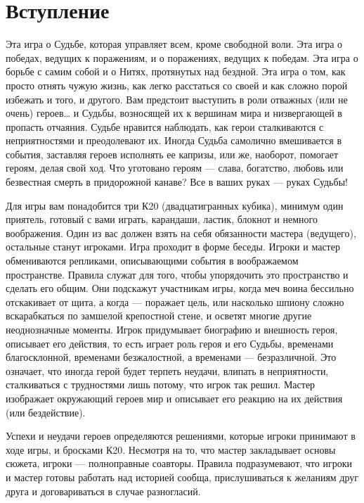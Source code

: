 \chapter*{Вступление}
Эта игра о Судьбе, которая управляет всем, кроме свободной воли. Эта игра о победах, ведущих к поражениям, и о поражениях, ведущих к победам. Эта игра о борьбе с самим собой и о Нитях, протянутых над бездной. Эта игра о том, как просто отнять чужую жизнь, как легко расстаться со своей и как сложно порой избежать и того, и другого.
Вам предстоит выступить в роли отважных (или не очень) героев… и Судьбы, возносящей их к вершинам мира и низвергающей в пропасть отчаяния. Судьбе нравится наблюдать, как герои сталкиваются с неприятностями и преодолевают их. Иногда Судьба самолично вмешивается в события, заставляя героев исполнять ее капризы, или же, наоборот, помогает героям, делая свой ход. Что уготовано героям — слава, богатство, любовь или безвестная смерть в придорожной канаве? Все в ваших руках — руках Судьбы!

Для игры вам понадобится три К20 (двадцатигранных кубика), минимум один приятель, готовый с вами играть, карандаши, ластик, блокнот и немного воображения. Один из вас должен взять на себя обязанности мастера (ведущего), остальные станут игроками. Игра проходит в форме беседы. Игроки и мастер обмениваются репликами, описывающими события в воображаемом пространстве. Правила служат для того, чтобы упорядочить это пространство и сделать его общим. Они подскажут участникам игры, когда меч воина бессильно отскакивает от щита, а когда — поражает цель, или насколько шпиону сложно вскарабкаться по замшелой крепостной стене, и осветят многие другие неоднозначные моменты. Игрок придумывает биографию и внешность героя, описывает его действия, то есть играет роль героя и его Судьбы, временами благосклонной, временами безжалостной, а временами — безразличной. Это означает, что иногда герой будет терпеть неудачи, влипать в неприятности, сталкиваться с трудностями лишь потому, что игрок так решил. Мастер изображает окружающий героев мир и описывает его реакцию на их действия (или бездействие).

Успехи и неудачи героев определяются решениями, которые игроки принимают в ходе игры, и бросками К20. Несмотря на то, что мастер закладывает основы сюжета, игроки — полноправные соавторы. Правила подразумевают, что игроки и мастер готовы работать над историей сообща, прислушиваться к желаниям друг друга и договариваться в случае разногласий.




